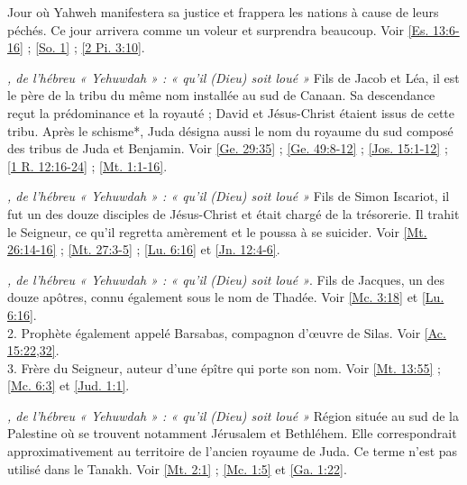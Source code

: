 \begin{multicols}{2}
\textit{}\newline
Jour où Yahweh manifestera sa justice et frappera les nations à cause de leurs péchés. Ce jour arrivera comme un voleur et surprendra beaucoup. Voir \vref{Es. 13:6-16} ; \vref{So. 1} ; \vref{2 Pi. 3:10}.

\textit{, de l'hébreu « Yehuwdah » : « qu'il (Dieu) soit loué »}\newline
Fils de Jacob et Léa, il est le père de la tribu du même nom installée au sud de Canaan. Sa descendance reçut la prédominance et la royauté ; David et Jésus-Christ étaient issus de cette tribu. Après le schisme*, Juda désigna aussi le nom du royaume du sud composé des tribus de Juda et Benjamin. Voir \vref{Ge. 29:35} ; \vref{Ge. 49:8-12} ; \vref{Jos. 15:1-12} ; \vref{1 R. 12:16-24} ; \vref{Mt. 1:1-16}.

\textit{, de l'hébreu « Yehuwdah » : « qu'il (Dieu) soit loué »}\newline
Fils de Simon Iscariot, il fut un des douze disciples de Jésus-Christ et était chargé de la trésorerie. Il trahit le Seigneur, ce qu'il regretta amèrement et le poussa à se suicider. Voir \vref{Mt. 26:14-16} ; \vref{Mt. 27:3-5} ; \vref{Lu. 6:16} et \vref{Jn. 12:4-6}.

\textit{, de l'hébreu « Yehuwdah » : « qu'il (Dieu) soit loué »}. Fils de Jacques, un des douze apôtres, connu également sous le nom de Thadée. Voir \vref{Mc. 3:18} et \vref{Lu. 6:16}.
\\2. Prophète également appelé Barsabas, compagnon d'œuvre de Silas. Voir \vref{Ac. 15:22,32}.
\\3. Frère du Seigneur, auteur d'une épître qui porte son nom. Voir \vref{Mt. 13:55} ; \vref{Mc. 6:3} et \vref{Jud. 1:1}.

\textit{, de l'hébreu « Yehuwdah » : « qu'il (Dieu) soit loué »}\newline
Région située au sud de la Palestine où se trouvent notamment Jérusalem et Bethléhem. Elle correspondrait approximativement au territoire de l'ancien royaume de Juda. Ce terme n'est pas utilisé dans le Tanakh. Voir \vref{Mt. 2:1} ; \vref{Mc. 1:5} et \vref{Ga. 1:22}.


\end{multicols}
